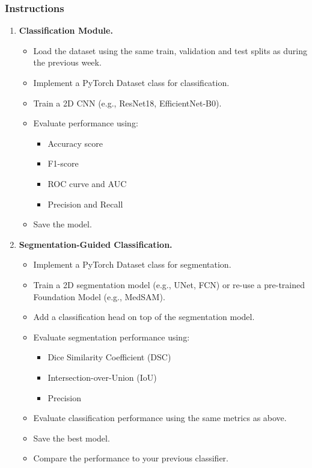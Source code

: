 \subsubsection*{Instructions}
\begin{enumerate}
  \item \textbf{Classification Module.}
    \begin{itemize}
      \item Load the dataset using the same train, validation and test splits as during the previous week.
      \item Implement a PyTorch Dataset class for classification.
      \item Train a 2D CNN (e.g., ResNet18, EfficientNet-B0).
      \item Evaluate performance using:
        \begin{itemize}
          \item Accuracy score
          \item F1-score
          \item ROC curve and AUC 
          \item Precision and Recall
        \end{itemize}
      \item Save the model.
    \end{itemize}

  \item \textbf{Segmentation-Guided Classification.}
    \begin{itemize}
      \item Implement a PyTorch Dataset class for segmentation.
      \item Train a 2D segmentation model (e.g., UNet, FCN) or re-use a pre-trained Foundation Model (e.g., MedSAM).
      \item Add a classification head on top of the segmentation model. 
      \item Evaluate segmentation performance using:
        \begin{itemize}
          \item Dice Similarity Coefficient (DSC)
          \item Intersection-over-Union (IoU)
          \item Precision 
        \end{itemize}
      \item Evaluate classification performance using the same metrics as above. 
      \item Save the best model.
      \item Compare the performance to your previous classifier.
    \end{itemize}


\end{enumerate}
